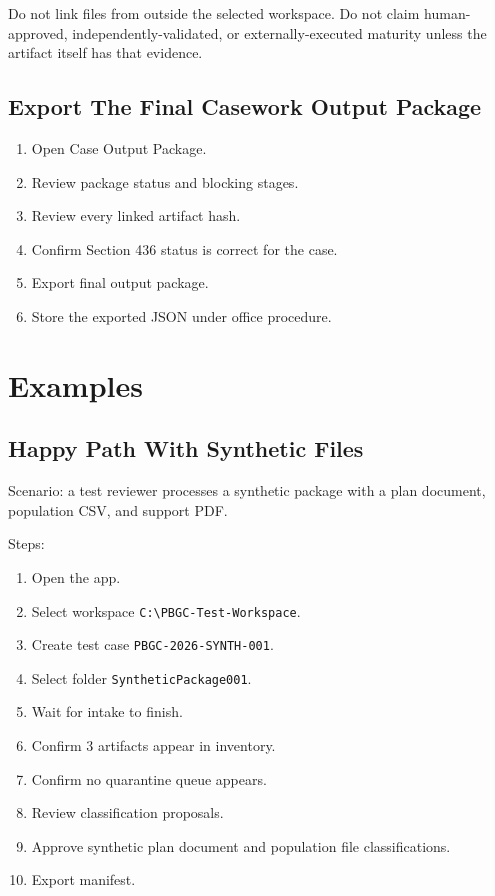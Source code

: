 Do not link files from outside the selected workspace. Do not claim human-approved, independently-validated, or externally-executed maturity unless the artifact itself has that evidence.

\section{Export The Final Casework Output Package}

\begin{enumerate}
  \item Open Case Output Package.
  \item Review package status and blocking stages.
  \item Review every linked artifact hash.
  \item Confirm Section 436 status is correct for the case.
  \item Export final output package.
  \item Store the exported JSON under office procedure.
\end{enumerate}

\chapter{Examples}

\section{Happy Path With Synthetic Files}

Scenario: a test reviewer processes a synthetic package with a plan document, population CSV, and support PDF.

Steps:

\begin{enumerate}
  \item Open the app.
  \item Select workspace \texttt{C:\textbackslash PBGC-Test-Workspace}.
  \item Create test case \texttt{PBGC-2026-SYNTH-001}.
  \item Select folder \texttt{SyntheticPackage001}.
  \item Wait for intake to finish.
  \item Confirm 3 artifacts appear in inventory.
  \item Confirm no quarantine queue appears.
  \item Review classification proposals.
  \item Approve synthetic plan document and population file classifications.
  \item Export manifest.
\end{enumerate}

